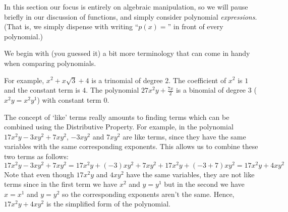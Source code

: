 In this section our focus is entirely on algebraic manipulation, so we will pause briefly in our discussion of functions, and simply consider polynomial \textit{expressions}. (That is, we simply dispense with writing ``$p(x)=$'' in front of every polynomial.)

We begin with (you guessed it) a bit more terminology that can come in handy when comparing polynomials.


\medskip

For example, $x^2 + x\sqrt{3} +4$ is a trinomial of degree $2$.  The coefficient of $x^2$ is $1$ and the constant term is $4$.  The polynomial $27x^2y + \frac{7x}{2}$ is a binomial of degree $3$ ($x^2y = x^2 y^1$) with constant term $0$.  

\medskip

The concept of `like' terms really amounts to finding terms which can be combined using the Distributive Property.  For example, in the polynomial $17x^2y - 3xy^2 + 7xy^2$, $-3xy^2$ and $7xy^2$ are like terms, since they have the same variables with the same corresponding exponents. This allows us to combine these two terms as follows:  \[17x^2y -  3xy^2 + 7xy^2 = 17x^2y + (-3)xy^2 + 7xy^2 + 17x^2y +(-3 + 7)xy^2 = 17x^2y + 4xy^2\]  Note that even though $17x^2y$ and $4xy^2$ have the same variables, they are not like terms since in the first term we have $x^2$ and $y = y^1$ but in the second we have $x = x^1$ and $y = y^2$ so the corresponding exponents aren't the same.  Hence,  $17x^2y + 4xy^2$ is the simplified form of the polynomial.  

